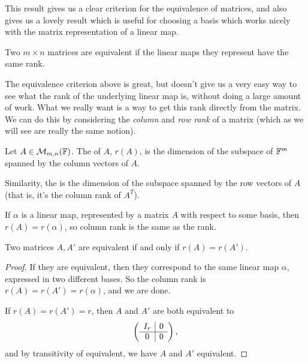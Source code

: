 \documentclass[a4paper]{scrartcl}
\begin{document}
This result gives us a clear criterion for the equivalence of matrices, and also gives us a lovely result which is useful for choosing a basis which works nicely with the matrix representation of a linear map.

\begin{corollary}
    Two $m \times n$ matrices are equivalent if the linear maps they represent have the same rank.
\end{corollary}

The equivalence criterion above is great, but doesn't give us a very easy way to see what the rank of the underlying linear map is, without doing a large amount of work. What we really want is a way to get this rank directly from the matrix. We can do this by considering the \emph{column} and \emph{row rank} of a matrix (which as we will see are really the same notion).

\begin{definition}
    Let $A \in \mathcal{M}_{m, n}(\mathbb{F})$. The  of $A$, $r(A)$, is the dimension of the subspace of $\mathbb{F}^m$ spanned by the column vectors of $A$.

    Similarity, the  is the dimension of the subspace spanned by the row vectors of $A$ (that is, it's the column rank of $A^T$).
\end{definition}

\begin{remark}
    If $\alpha$ is a linear map, represented by a matrix $A$ with respect to some basis, then $r(A) = r(\alpha)$, so column rank is the same as the rank.
\end{remark}

\begin{proposition}
    Two matrices $A, A'$ are equivalent if and only if $r(A) = r(A')$.
\end{proposition}
\begin{proof}
    If they are equivalent, then they correspond to the same linear map $\alpha$, expressed in two different bases. So the column rank is $r(A) = r(A') = r(\alpha)$, and we are done.

    If $r(A) = r(A') = r$, then $A$ and $A'$ are both equivalent to
    $$
    \left(\begin{array}{ c | c }
        I_r & 0 \\
        \hline
        0 & 0
      \end{array}\right),
      $$
      and by transitivity of equivalent, we have $A$ and $A'$ equivalent.
\end{proof}
\end{document}
